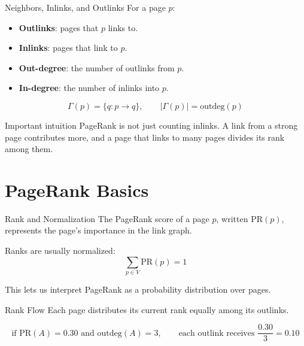 \documentclass[aspectratio=169,11pt]{beamer}
\newcommand{\PR}{\mathrm{PR}}
\newcommand{\outdeg}{\mathrm{outdeg}}
\begin{document}
\begin{frame}{Neighbors, Inlinks, and Outlinks}
For a page \(p\):
\begin{itemize}
  \item \textbf{Outlinks}: pages that \(p\) links to.
  \item \textbf{Inlinks}: pages that link to \(p\).
  \item \textbf{Out-degree}: the number of outlinks from \(p\).
  \item \textbf{In-degree}: the number of inlinks into \(p\).
\end{itemize}

\[
\Gamma(p)=\{q : p \rightarrow q\}, \qquad |\Gamma(p)|=\outdeg(p)
\]

\begin{block}{Important intuition}
PageRank is not just counting inlinks. A link from a strong page contributes
more, and a page that links to many pages divides its rank among them.
\end{block}
\end{frame}

\section{PageRank Basics}

\begin{frame}{Rank and Normalization}
The PageRank score of a page \(p\), written \(\PR(p)\), represents the page's
importance in the link graph.

\vspace{0.5em}
Ranks are usually normalized:
\[
\sum_{p \in V} \PR(p)=1
\]

This lets us interpret PageRank as a probability distribution over pages.
\end{frame}

\begin{frame}{Rank Flow}
Each page distributes its current rank equally among its outlinks.

\[
\text{if } \PR(A)=0.30 \text{ and } \outdeg(A)=3,
\qquad
\text{each outlink receives } \frac{0.30}{3}=0.10
\]

\centering
{}
\end{frame}
\end{document}
